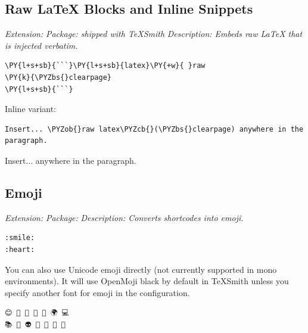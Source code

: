 \documentclass[a4paper,twoside]{article}
\begin{document}
\subsection{Raw \LaTeX{} Blocks and Inline Snippets}
\emph{Extension: }
\emph{Package: shipped with TeXSmith}
\emph{Description: Embeds raw \LaTeX{} that is injected verbatim.}
\begin{tscode}[lang=md, engine=pygments]
\begin{Verbatim}[commandchars=\\\{\},breaklines, breakanywhere, commandchars=\\\{\}]
\PY{l+s+sb}{```}\PY{l+s+sb}{latex}\PY{+w}{ }raw
\PY{k}{\PYZbs{}clearpage}
\PY{l+s+sb}{```}
\end{Verbatim}
\end{tscode}
\clearpage
Inline variant:
\begin{tscode}[lang=md, engine=pygments]
\begin{Verbatim}[commandchars=\\\{\},breaklines, breakanywhere, commandchars=\\\{\}]
Insert... \PYZob{}raw latex\PYZcb{}(\PYZbs{}clearpage) anywhere in the paragraph.
\end{Verbatim}
\end{tscode}
Insert... \clearpage anywhere in the paragraph.
\subsection{Emoji}
\emph{Extension: }
\emph{Package: }
\emph{Description: Converts shortcodes into emoji.}
\begin{tscode}[lang=md, engine=pygments]
\begin{Verbatim}[commandchars=\\\{\},breaklines, breakanywhere, commandchars=\\\{\}]
:smile:
:heart:
\end{Verbatim}
\end{tscode}
\begin{displayquote}
\end{displayquote}
You can also use Unicode emoji directly (not currently supported in mono environments). It will use OpenMoji black by default in TeXSmith unless you specify another font for emoji in the configuration.
\begin{tscode}[lang=md, engine=pygments]
\begin{Verbatim}[commandchars=\\\{\},breaklines, breakanywhere, commandchars=\\\{\}]
😊 🚀 🍕 🎉 🐍 🌍 💻
📚 🎨 👽 👋 🤖 🦄 🧠
\end{Verbatim}
\end{tscode}
\begin{displayquote}
      
      
\end{displayquote}
\end{document}
